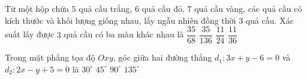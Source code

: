 \begin{ex}%
	Từ một hộp chứa $5$ quả cầu trắng, $6$ quả cầu đỏ, $7$ quả cầu vàng, các quả cầu có kích thước và khối lượng giống nhau, lấy ngẫu nhiên đồng thời $3$ quả cầu. Xác suất lấy được $3$ quả cầu có ba màu khác nhau là
	\choice
	{$\dfrac{35}{68}$}
	{\True $\dfrac{35}{136}$}
	{$\dfrac{11}{24}$}
	{$\dfrac{11}{36}$}
\end{ex}
\begin{ex}%
	Trong mặt phẳng tọa độ $Oxy$, góc giữa hai đường thẳng $d_1\colon 3x+y-6=0$ và $d_2\colon 2x-y+5=0$ là
	\choice
	{$30^{\circ}$}
	{\True $45^{\circ}$}
	{$90^{\circ}$}
	{$135^{\circ}$}
\end{ex}
